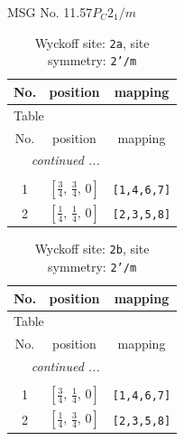 \documentclass[fleqn,8pt]{jsarticle}
\begin{document}
\setcounter{MaxMatrixCols}{32}

\renewcommand{\tablename}{Table~}
\renewcommand{\figurename}{Figure~}
\begin{center}
\LARGE
MSG No. 11.57\quad$P_{C}2_{1}/m$
\end{center}
\renewcommand{\arraystretch}{1.2}
\begin{longtable}{ccc}
\caption{Wyckoff site: {\tt 2a}, site symmetry: {\tt 2'/m}}
 \\
 \hline \hline
No. & position & mapping \\ \hline \endfirsthead

\multicolumn{2}{l}{\tablename\ \thetable{}} \\
 \hline \hline
No. & position & mapping \\ \hline \endhead

 \hline \hline
\multicolumn{2}{r}{\footnotesize\it continued ...} \\ \endfoot

 \hline \hline
\multicolumn{2}{r}{} \\ \endlastfoot

1 & $\left[ \frac{3}{4},\, \frac{3}{4},\, 0 \right]$ & {\tt [1,4,6,7]} \\ \hline
2 & $\left[ \frac{1}{4},\, \frac{1}{4},\, 0 \right]$ & {\tt [2,3,5,8]} \\
\end{longtable}
\renewcommand{\arraystretch}{1.2}
\begin{longtable}{ccc}
\caption{Wyckoff site: {\tt 2b}, site symmetry: {\tt 2'/m}}
 \\
 \hline \hline
No. & position & mapping \\ \hline \endfirsthead

\multicolumn{2}{l}{\tablename\ \thetable{}} \\
 \hline \hline
No. & position & mapping \\ \hline \endhead

 \hline \hline
\multicolumn{2}{r}{\footnotesize\it continued ...} \\ \endfoot

 \hline \hline
\multicolumn{2}{r}{} \\ \endlastfoot

1 & $\left[ \frac{3}{4},\, \frac{1}{4},\, 0 \right]$ & {\tt [1,4,6,7]} \\ \hline
2 & $\left[ \frac{1}{4},\, \frac{3}{4},\, 0 \right]$ & {\tt [2,3,5,8]} \\
\end{longtable}
\end{document}
